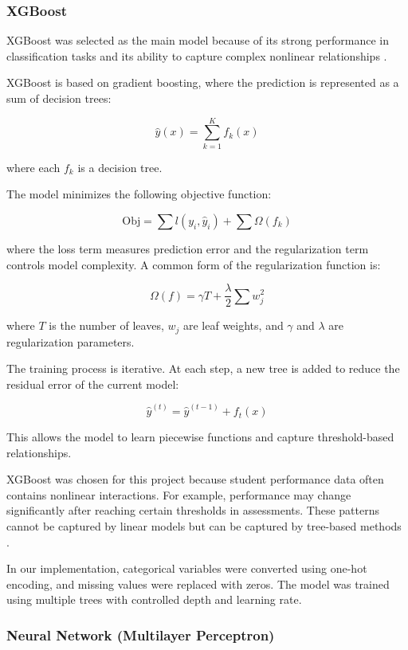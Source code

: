 \documentclass[conference]{IEEEtran}
\begin{document}
\subsubsection{XGBoost}

XGBoost was selected as the main model because of its strong performance in classification tasks and its ability to capture complex nonlinear relationships \cite{ki2026, sitompul2025}.

XGBoost is based on gradient boosting, where the prediction is represented as a sum of decision trees:

\[
\hat{y}(x) = \sum_{k=1}^{K} f_k(x)
\]

where each $f_k$ is a decision tree.

The model minimizes the following objective function:

\[
\text{Obj} = \sum l(y_i, \hat{y}_i) + \sum \Omega(f_k)
\]

where the loss term measures prediction error and the regularization term controls model complexity. A common form of the regularization function is:

\[
\Omega(f) = \gamma T + \frac{\lambda}{2} \sum w_j^2
\]

where $T$ is the number of leaves, $w_j$ are leaf weights, and $\gamma$ and $\lambda$ are regularization parameters.

The training process is iterative. At each step, a new tree is added to reduce the residual error of the current model:

\[
\hat{y}^{(t)} = \hat{y}^{(t-1)} + f_t(x)
\]

This allows the model to learn piecewise functions and capture threshold-based relationships.

XGBoost was chosen for this project because student performance data often contains nonlinear interactions. For example, performance may change significantly after reaching certain thresholds in assessments. These patterns cannot be captured by linear models but can be captured by tree-based methods \cite{ki2026}.

In our implementation, categorical variables were converted using one-hot encoding, and missing values were replaced with zeros. The model was trained using multiple trees with controlled depth and learning rate.

\subsubsection{Neural Network (Multilayer Perceptron)}
\end{document}
